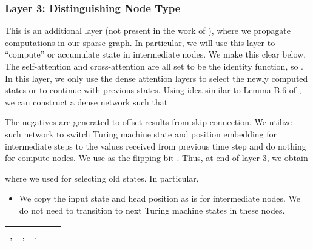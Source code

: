 \documentclass{article}
\begin{document}
\subsubsection{Layer 3: Distinguishing Node Type}
\label{sec:appndx-new-layer}
This is an additional layer (not present in the work of \cite{Perez19}), where we propagate computations 
in our sparse graph. 
In particular, we will use this layer to ``compute'' or accumulate state in intermediate nodes. 
We make this clear below.
The self-attention and cross-attention are all set to be the identity function, so .
In this layer, we only use the dense attention layers to select the newly computed states or to continue 
with previous states.
Using idea similar to Lemma B.6 of \citep{Perez19}, we can construct a dense network such that

The negatives are generated to offset results from skip connection. 
We utilize such network to switch Turing machine state and position embedding for intermediate steps to the values received from previous time step and do nothing for compute nodes. 
We use  as the flipping bit .
Thus, at end of layer 3, we obtain

where we used  for selecting old states. In particular,
\vspace{-3mm}
\begin{itemize}[leftmargin=6mm, itemsep=2mm, partopsep=0mm,parsep=0mm]
    \item We copy the input state and head position as is for intermediate nodes. We do not need to transition to next Turing machine states in these nodes.
\end{itemize}

\begin{table}[h]
    \small
    \vspace{-3mm}
    \hspace*{12mm}
    \begin{tabular}{lclcl}
     ,
    &
     ,
    &
     .
    \end{tabular}
    \vspace{-3mm}
\end{table}
\end{document}
